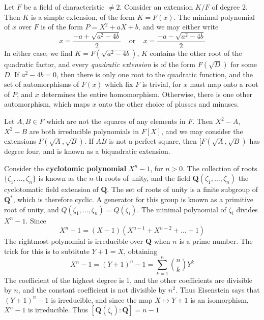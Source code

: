 \begin{example}
    Let $F$ be a field of characteristic $\neq 2$. Consider an extension $K/F$ of degree 2. Then $K$ is a simple extension, of the form $K = F(x)$. The minimal polynomial of $x$ over $F$ is of the form $P = X^2 + aX + b$, and we may either write
    \[ x = \frac{-a + \sqrt{a^2 - 4b}}{2}\ \ \ \ \ \text{or}\ \ \ \ \ x = \frac{-a - \sqrt{a^2 - 4b}}{2} \]
    In either case, we find $K = F(\sqrt{a^2 - 4b})$, $K$ contains the other root of the quadratic factor, and every {\it quadratic extension} is of the form $F(\sqrt{D})$ for some $D$. If $a^2 - 4b = 0$, then there is only one root to the quadratic function, and the set of automorphisms of $F(x)$ which fix $F$ is trivial, for $x$ must map onto a root of $P$, and $x$ determines the entire homomorphism. Otherwise, there is one other automorphism, which maps $x$ onto the other choice of plusses and minuses.
\end{example}

\begin{example}
    Let $A,B \in F$ which are not the squares of any elements in $F$. Then $X^2 - A$, $X^2 - B$ are both irreducible polynomials in $F[X]$, and we may consider the extensions $F(\sqrt{A}, \sqrt{B})$. If $AB$ is not a perfect square, then $[F(\sqrt{A}, \sqrt{B})$ has degree four, and is known as a biquadratic extension.
\end{example}

\begin{example}
    Consider the {\bf cyclotomic polynomial} $X^n - 1$, for $n > 0$. The collection of roots $\{ \zeta_1, \dots, \zeta_n \}$ is known as the $n$-th roots of unity, and the field $\mathbf{Q}(\zeta_1, \dots, \zeta_n)$ the cyclotomatic field extension of $\mathbf{Q}$. The set of roots of unity is a finite subgroup of $\mathbf{Q}^*$, which is therefore cyclic. A generator for this group is known as a primitive root of unity, and $Q(\zeta_1, \dots, \zeta_n) = Q(\zeta_i)$. The minimal polynomial of $\zeta_i$ divides $X^n - 1$. Since
    \[ X^n - 1 = (X - 1)(X^{n-1} + X^{n-2} + \dots + 1) \]
    The rightmost polynomial is irreducible over $\mathbf{Q}$ when $n$ is a prime number. The trick for this is to subtitute $Y+1 = X$, obtaining
    \[ X^n - 1 = (Y+1)^n - 1 = \sum_{k = 1}^n \binom{n}{k} Y^k \]
    The coefficient of the highest degree is 1, and the other coefficients are divisible by $n$, and the constant coefficient is not divisible by $n^2$. Thus Eisenstein says that $(Y + 1)^n - 1$ is irreducible, and since the map $X \mapsto Y + 1$ is an isomorphism, $X^n - 1$ is irreducible. Thus $[\mathbf{Q}(\zeta_i): \mathbf{Q}] = n - 1$
\end{example}









